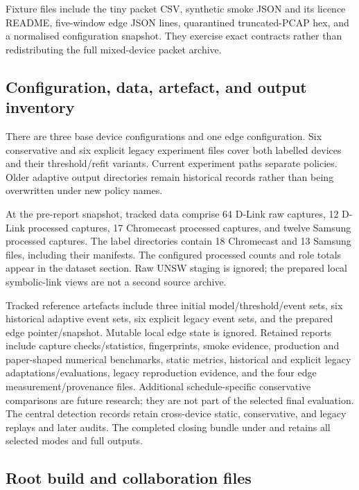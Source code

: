 Fixture files include the tiny packet CSV, synthetic smoke JSON and its licence
README, five-window edge JSON lines, quarantined truncated-PCAP hex, and a
normalised configuration snapshot. They exercise exact contracts rather than
redistributing the full mixed-device packet archive.

\subsection{Configuration, data, artefact, and output inventory}

There are three base device configurations and one edge configuration. Six
conservative and six explicit legacy experiment files cover both labelled
devices and their threshold/refit variants. Current experiment paths separate
policies. Older adaptive output directories remain historical records rather
than being overwritten under new policy names.

At the pre-report snapshot, tracked data comprise 64 D-Link raw captures,
12 D-Link processed captures, 17 Chromecast processed captures, and twelve
Samsung processed captures. The label directories contain 18 Chromecast and
13 Samsung files, including their manifests. The configured processed counts
and role totals appear in the dataset section. Raw UNSW staging is ignored;
the prepared local symbolic-link views are not a second source archive.

Tracked reference artefacts include three initial model/threshold/event sets,
six historical adaptive event sets, six explicit legacy event sets, and the
prepared edge pointer/snapshot. Mutable local edge state is ignored. Retained
reports include capture checks/statistics, fingerprints, smoke evidence,
production and paper-shaped numerical benchmarks, static metrics, historical
and explicit legacy adaptations/evaluations, legacy reproduction evidence,
and the four edge measurement/provenance files. Additional schedule-specific conservative comparisons are future research;
they are not part of the selected final evaluation. The central detection records retain cross-device static,
conservative, and legacy replays and later audits. The completed closing
bundle under  and
 retains all selected modes and full outputs.

\subsection{Root build and collaboration files}

